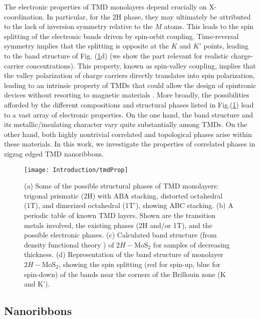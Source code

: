 The electronic properties of \ac{TMD} monolayers depend crucially on $\text{X}$-coordination.
In particular, for the 2H phase, they may ultimately be attributed to the lack of inversion symmetry relative to the $M$ atoms.
This leads to the spin splitting of the electronic bands driven by spin-orbit coupling.
Time-reversal symmetry implies that the splitting is opposite at the $K$ and $K'$ points, leading to the band structure of Fig. (\ref{fig:tmdProp}d) (we show the part relevant for realistic charge-carrier concentrations).
This property, known as spin-valley coupling, implies that the valley polarization of charge carriers directly translates into spin polarization, leading to an intrinsic property of \acp{TMD} that could allow the design of spintronic devices without resorting to magnetic materials \cite{manzeli_2d_2017}.
More broadly, the possibilities afforded by the different compositions and structural phases listed in Fig.(\ref{fig:tmdProp}) lead to a vast array of electronic properties.
On the one hand, the band structure and its metallic/insulating character vary quite substantially among \acp{TMD}.
On the other hand, both highly nontrivial  correlated and topological phases arise within these materials.
In this work, we investigate the properties of correlated phases in zigzag edged \ac{TMD} nanoribbons.
\begin{figure}
\centering
\texttt{[image: Introduction/tmdProp]}
 \caption[Structure and electronic properties of \ac{TMD} monolayers.]{(a) Some of the possible structural phases of \ac{TMD} monolayers: trigonal prismatic (2H) with ABA stacking, distorted octahedral (1T), and dimerized octahedral (1T'), showing ABC stacking. (b) A periodic table of known \ac{TMD} layers. Shown are the transition metals involved, the existing phases (2H and/or 1T), and the possible electronic phases. (c) Calculated band structure (from density functional theory \cite{splendiani_emerging_2010}) of $2H-\text{Mo}\text{S}_2$ for samples of decreasing thickness. (d) Representation of the band structure of monolayer $2H-\text{Mo}\text{S}_2$, showing the spin splitting (red for spin-up, blue for spin-down) of the bands near the corners of the Brillouin zone (K and K'). \label{fig:tmdProp}}
\end{figure}

\subsection{Nanoribbons}\label{subsec:nanoribbons}


